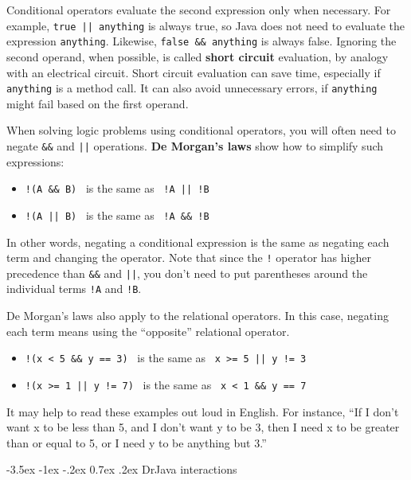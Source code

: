 \documentclass[12pt]{book}
\makeatletter
\theoremstyle{exercise}
\newcommand{\java}[1]{\verb"#1"}
\renewcommand{\section}{\@startsection{section}{1}{\z@}%
    {-3.5ex \@plus -1ex \@minus -.2ex}%
    {0.7ex \@plus.2ex}%
    {\normalfont\Large\bfseries}}
\newcommand{\java}[1]{\lstinline{#1}} %
\makeatother
\begin{document}

Conditional operators evaluate the second expression only when necessary.
For example, \java{true || anything} is always true, so Java does not need to evaluate the expression \java{anything}.
Likewise, \java{false && anything} is always false.
Ignoring the second operand, when possible, is called {\bf short circuit} evaluation, by analogy with an electrical circuit.
Short circuit evaluation can save time, especially if \java{anything} is a method call.
It can also avoid unnecessary errors, if \java{anything} might fail based on the first operand.


When solving logic problems using conditional operators, you will often need to negate \java{&&} and \java{||} operations.
{\bf De Morgan's laws} show how to simplify such expressions:

\begin{itemize}
\item \java{!(A && B)} ~is the same as~ \java{!A || !B}
\item \java{!(A || B)} ~is the same as~ \java{!A && !B}
\end{itemize}

In other words, negating a conditional expression is the same as negating each term and changing the operator.
Note that since the \java{!} operator has higher precedence than \java{&&} and \java{||}, you don't need to put parentheses around the individual terms \java{!A} and \java{!B}.

De Morgan's laws also apply to the relational operators.
In this case, negating each term means using the ``opposite'' relational operator.

\begin{itemize}
\item \java{!(x < 5 && y == 3)} ~is the same as~ \java{x >= 5 || y != 3}
\item \java{!(x >= 1 || y != 7)} ~is the same as~ \java{x < 1 && y == 7}
\end{itemize}

It may help to read these examples out loud in English.
For instance, ``If I don't want x to be less than 5, and I don't want y to be 3, then I need x to be greater than or equal to 5, or I need y to be anything but 3.''


\section{DrJava interactions}
\end{document}
